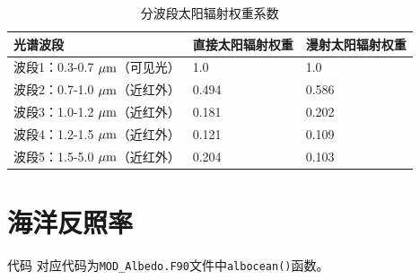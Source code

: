\begin{table}[htbp]
\centering
\caption{分波段太阳辐射权重系数}
\label{tab:太阳辐射权重系数}
\begin{tabular}{lll}
\toprule
光谱波段 & 直接太阳辐射权重 & 漫射太阳辐射权重 \\ \midrule
波段1：0.3-0.7 $\mu \rm{m}$（可见光） & 1.0 & 1.0 \\
波段2：0.7-1.0 $\mu \rm{m}$（近红外） & 0.494 & 0.586 \\
波段3：1.0-1.2 $\mu \rm{m}$（近红外） & 0.181 & 0.202 \\
波段4：1.2-1.5 $\mu \rm{m}$（近红外） & 0.121 & 0.109 \\
波段5：1.5-5.0 $\mu \rm{m}$（近红外） & 0.204 & 0.103 \\ \bottomrule
\end{tabular}
\end{table}

\section{海洋反照率}\label{海洋反照率}
\begin{mymdframed}{代码}
对应代码为\texttt{MOD\_Albedo.F90}文件中\texttt{albocean()}函数。
\end{mymdframed}

